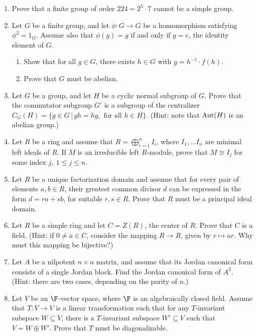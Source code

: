 \documentclass{article}
\begin{document}
\begin{enumerate}

\item Prove that a finite group of order $224=2^5\cdot 7$ cannot be a simple group.

\item Let $G$ be a finite group, and let $\phi:G\to G$ be a homomorphism
satisfying $\phi^2=1_G$. Assume also that $\phi(g)=g$ if and only if
$g=e$, the identity element of $G$. 
\begin{enumerate}
\item Show that for all $g\in G$, there exists $h\in G$ with $g=h^{-1}\cdot f(h)$.
\item Prove that $G$ must be abelian.
\end{enumerate}
 
\item Let $G$ be a group, and let $H$ be a cyclic normal subgroup of $G$. Prove
that the commutator subgroup $G'$ is a subgroup of the centralizer 
$C_G(H)=\{g\in G\,|\, gh=hg, \mbox{ for all }h\in H\}.$ (Hint:  note that
${\rm Aut}(H)$ is an abelian group.)

\item Let $R$ be a ring and assume that $R=
 \bigoplus _{i=1}^nI_i $, where $I_1,\ldots I_n$ are minimal left ideals
of $R$.  If $M$ is an irreducible left $R$-module, prove that $M\cong
I_j$ for some index $j,\ 1\leq j\leq n$.

\item Let $R$ be a unique factorization domain and assume that for every
pair of elements $a,b\in R$, their greatest common divisor $d$ can be
expressed in the form $d=ra+sb$, for suitable $r,s\in R$. Prove that
$R$ must be a principal ideal domain.  

\item  Let $R$ be a simple ring and let $C=Z(R)$,
the center of $R$.  Prove that $C$ is a field. (Hint: if $0\not=a\in C$,
consider the mapping $R\to R$, given by $r\mapsto ar$. Why must this
mapping be bijective?)


\item Let $A$ be a nilpotent $n\times n$ matrix, and assume that its
Jordan canonical form consists of a single Jordan block. Find the
Jordan canonical form of $A^2$. (Hint: there are two cases, depending
on the parity of $n$.)

\item Let $V$ be an $\F$-vector space, where $\F$ is an algebraically closed
field. Assume that $T:V\to V$ is a linear transformation such that for any
$T$-invariant subspace $W\subseteq V$, there is a $T$-invariant subspace
$W'\subseteq V$ such that $V=W\oplus W'$. Prove that $T$ must be diagonalizable.


\end{enumerate}
\end{document}
